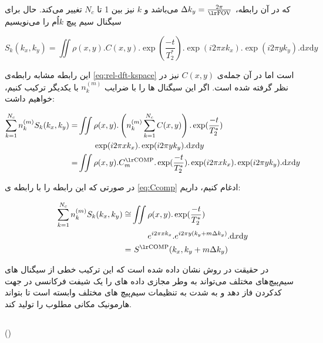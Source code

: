 که در آن رابطه، $\Delta k_y = \frac{2\pi}{\lrtext{FOV}}$
می‌باشد و $k$ نیز بین 1 تا $N_c$ تغییر می‌کند.
حال برای سیگنال سیم پیچ $k$اُم را می‌نویسیم


\removevspace
\begin{equation}
	S_k(k_x, k_y) = \iint \rho(x,y) . C(x,y) . \exp(\frac{-t}{T_2^*}) . \exp(i2\pi x k_x) .\exp(i2\pi y k_y) . \mathrm{d}x \mathrm{d}y
\end{equation}

این رابطه مشابه رابطه‌ی \ref{eq:rel-dft-kspace}
است اما در آن جمله‌ی $C(x,y)$ نیز در نظر گرفته شده است. اگر این سیگنال ها را با ضرایب  $n_k^{(m)}$
با یکدیگر ترکیب کنیم، خواهیم داشت:


\removevspace
\begin{equation}
\begin{aligned}
	\sum_{k=1}^{N_c} n_k^{(m)} S_k(k_x, k_y) =&  \iint  \rho(x,y) . \left(n_k^{(m)}  \sum_{k=1}^{N_c} C(x,y) \right) . \exp(\frac{-t}{T_2^*}) \\
	&\qquad \exp(i2\pi x k_x) . \exp(i2\pi y k_y) . \mathrm{d}x \mathrm{d}y \\
	 =& \iint  \rho(x,y) . C_m^{\lrtext{COMP}} . \exp(\frac{-t}{T_2^*}) .\exp(i2\pi x k_x) . \exp(i2\pi y k_y) . \mathrm{d}x \mathrm{d}y 
\end{aligned}
\end{equation}


در صورتی که این رابطه را با رابطه ی \ref{eq:Ccomp}
ادغام کنیم، داریم:




\removevspace
\begin{equation}
	\begin{aligned}
		\sum_{k=1}^{N_c} n_k^{(m)} S_k(k_x, k_y) \cong& \iint  \rho(x,y) . \exp(\frac{-t}{T_2^*}) \\
		&\qquad e^{i2\pi x k_x} . e^{i2\pi y (k_y + m\Delta k_y)} . \mathrm{d}x \mathrm{d}y \\
		=&\ S^{\lrtext{COMP}}(k_x, k_y + m \Delta k_y)
	\end{aligned}
\end{equation}


در حقیقت در روش  نشان داده شده است که این ترکیب خطی از سیگنال های سیم‌پیچ‌های مختلف می‌تواند به وطر مجازی داده های \kspace 
را یک شیفت فرکانسی در جهت کدکردن فاز دهد و به شدت به تنظیمات سیم‌پیچ های مختلف وابسته است تا بتواند هارمونیک مکانی مطلوب را تولید کند.






\FloatBarrier
\subsection{}

()

\cite{GRAPPA-Griswold2002}








